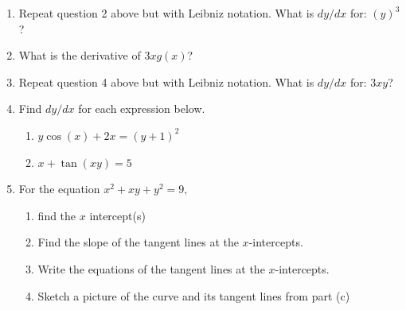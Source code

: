 \documentclass[11pt,fleqn]{article}
\begin{document}
\begin{enumerate}
 \vfill
 
 \item Repeat question 2 above but with Leibniz notation. What is $dy/dx$ for: \quad \large{${\displaystyle{\left(y \right)^3}}$}\quad?\\
 
  \vfill
 
 \item What is the derivative of  \quad \large{${\displaystyle{ 3xg(x)}}$}\quad?\\
 
  \vfill
 
 \item Repeat question 4 above but with Leibniz notation. What is $dy/dx$ for: \quad \large{${\displaystyle{3xy}}$}\quad?\\
 
  \vfill
  
  \newpage
  \item Find $dy/dx$ for each expression below.
  	\begin{enumerate}
	\item $y \cos(x) +2x=(y+1)^2$
	\vspace{2in}
	\item $x+\tan(xy)=5$
	\vspace{2in}
	\end{enumerate}

\item For the equation $x^2+xy+y^2=9,$ 
	\begin{enumerate}
	\item find the $x$ intercept(s)
	\vfill
	\item Find the slope of the tangent lines at the $x$-intercepts.
	\vfill
	\item Write the equations of the tangent lines at the $x$-intercepts.
	\vfill
	\item Sketch a picture of the curve and its tangent lines from part (c)
	\vfill
	\end{enumerate} 
 


\end{enumerate}
\end{document}
